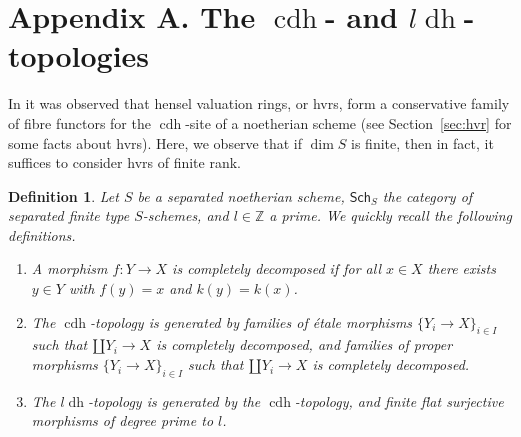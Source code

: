 \documentclass[10pt]{amsart}
\newtheorem{defi}[theo]{Definition}
\theoremstyle{definition}
\newcommand{\ZZ}{\mathbb{Z}}
\newcommand{\zll}{\mathbb{Z}_{(l)}}
\DeclareMathOperator{\Frac}{Frac}
\newcommand{\Sch}{\mathsf{Sch}}
\newcommand{\fpsl}{{\operatorname{fps\!}l'}}
\newcommand{\getfpsl}{{\operatorname{g{.}et{.}fps\!}l'}}
\newcommand{\cdh}{{{\operatorname{cdh}}}}
\newcommand{\ldh}{{l{\operatorname{dh}}}}
\newcommand{\uh}{\operatorname{uh}}
\begin{document}
%


\section{Appendix A. The $\cdh$- and $\ldh$-topologies} \label{sec:cdhldh}

In \cite{GK15} it was observed that hensel valuation rings, or hvrs, form a conservative family of fibre functors for the $\cdh$-site of a noetherian scheme (see Section~\ref{sec:hvr} for some facts about hvrs). Here, we observe that if $\dim S$ is finite, then in fact, it suffices to consider hvrs of finite rank.

\begin{defi} 
Let $S$ be a separated noetherian scheme, $\Sch_S$ the category of separated finite type $S$-schemes, and $l \in \ZZ$ a prime. We quickly recall the following definitions.
\begin{enumerate}
 \item A morphism $f: Y \to X$ is \emph{completely decomposed} if for all $x \in X$ there exists $y \in Y$ with $f(y) = x$ and $k(y) = k(x)$.
 \item The $\cdh$-topology is generated by families of étale morphisms $\{Y_i \to X\}_{i \in I}$ such that $\amalg Y_i \to X$ is completely decomposed, and families of proper morphisms $\{Y_i \to X\}_{i \in I}$ such that $\amalg Y_i \to X$ is completely decomposed.
 
 \item The $\ldh$-topology is generated by the $\cdh$-topology, and finite flat surjective morphisms of degree prime to $l$.
\end{enumerate}
\end{defi}
\end{document}
